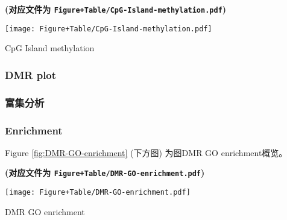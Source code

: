 \documentclass[
]{article}
\begin{document}
\textbf{(对应文件为 \texttt{Figure+Table/CpG-Island-methylation.pdf})}

\def\@captype{figure}
\begin{center}
\texttt{[image: Figure+Table/CpG-Island-methylation.pdf]}
\caption{CpG Island methylation}\label{fig:CpG-Island-methylation}
\end{center}

\begin{center}\vspace{1.5cm}\end{center}

\hypertarget{dmr-plot}{%
\subsubsection{DMR plot}\label{dmr-plot}}

\hypertarget{ux5bccux96c6ux5206ux6790-1}{%
\subsubsection{富集分析}\label{ux5bccux96c6ux5206ux6790-1}}

\hypertarget{enrichment}{%
\subsubsection{Enrichment}\label{enrichment}}

\begin{center}\vspace{1.5cm}\end{center}

Figure \ref{fig:DMR-GO-enrichment} (下方图) 为图DMR GO enrichment概览。

\textbf{(对应文件为 \texttt{Figure+Table/DMR-GO-enrichment.pdf})}

\def\@captype{figure}
\begin{center}
\texttt{[image: Figure+Table/DMR-GO-enrichment.pdf]}
\caption{DMR GO enrichment}\label{fig:DMR-GO-enrichment}
\end{center}

\begin{center}\vspace{1.5cm}\end{center}

\begin{center}\vspace{1.5cm}\end{center}
\end{document}
